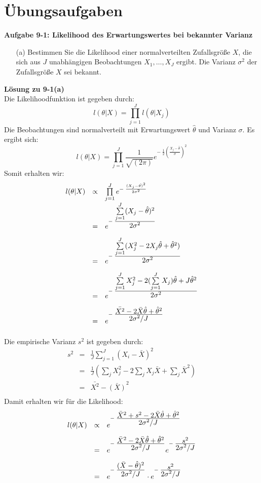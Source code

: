 \newpage
\section{Übungsaufgaben}
\textbf{Aufgabe 9-1: Likelihood des Erwartungswertes bei bekannter Varianz}
\begin{itemize}
	\item [(a)] Bestimmen Sie die Likelihood einer normalverteilten Zufallsgröße $X$, die sich aus $J$ unabhängigen Beobachtungen $X_1,\ldots,X_J$ ergibt.
	Die Varianz $\sigma^2$ der Zufallsgröße $X$ sei bekannt.
\end{itemize}

\textbf{Lösung zu 9-1(a)} \\
Die Likelihoodfunktion ist gegeben durch:
\[
l(\theta|X) = \prod_{j=1}^{J} l(\theta|X_j)
\]
Die Beobachtungen sind normalverteilt mit Erwartungswert
$\hat{\theta}$ und Varianz $\sigma$. Es ergibt sich:
\[
l(\theta|X) = \prod_{j=1}^{J} \frac{1}{\sqrt{(2 \pi)}}
e^{-\;\frac{1}{2}\left(\frac{X_j-\hat{\theta}}{\sigma}\right)^2}
\]
Somit erhalten wir:
\[
\begin{array}{rcl}
l(\theta|X) & \propto &  \prod\limits_{j=1}^{J}
e^{-\;\frac{(X_j-\hat{\theta)}^2}{2\sigma^2}} \\[2ex]
&=& e^{-\;\frac{\textstyle\sum\limits_{j=1}^{J}(X_j-\hat{\theta})^2}
	{\textstyle 2 \sigma^2}} \\[2ex]
&=& e^{-\;\frac{\textstyle\sum\limits_{j=1}^{J}(X_j^2-2X_j\hat{\theta}
	+\hat{\theta}^2)}
	{\textstyle 2 \sigma^2}} \\[2ex]
&=& e^{-\;\frac{\textstyle\sum\limits_{j=1}^{J}X_j^2
		- 2 (\sum\limits_{j=1}^{J}X_j) \hat{\theta}
		+J \hat{\theta}^2}
	{\textstyle 2 \sigma^2}} \\[2ex]
&=& e^{-\;\frac{\textstyle \bar{X^2}-2\bar{X}\hat{\theta}+\hat{\theta}^2}
	{\textstyle 2 \sigma^2/J}} \\[2ex]
\end{array}
\]
Die empirische Varianz $s^2$ ist gegeben durch:
\[
\begin{array}{rcl}
s^2 &=& \frac{1}{J} \sum\limits_{j=1}^{J} (X_i - \bar{X})^2 \\[2ex]
    &=& \frac{1}{J} (\sum_j X_j^2-2 \sum_j X_j \bar{X} + \sum_j \bar{X}^2) \\[2ex]
    &=& \bar{X^2} -\bar{(X)}^2 \\[2ex]
\end{array}
\]
Damit erhalten wir für die Likelihood:
\[
\begin{array}{rcl}
l(\theta|X) & \propto &
e^{-\;\frac{\textstyle \bar{X}^2 +s^2 -2\bar{X} \hat{\theta}+\hat{\theta}^2}
	{\textstyle 2 \sigma^2/J}} \\[2ex]
&=& e^{-\;\frac{\textstyle \bar{X}^2 -2\bar{X} \hat{\theta}+\hat{\theta}^2}
	{\textstyle 2 \sigma^2/J}}
e^{-\;\frac{\textstyle s^2 }
	{\textstyle 2 \sigma^2/J}} \\[2ex]
&=& e^{-\;\frac{\textstyle (\bar{X} - \hat{\theta})^2}
	{\textstyle 2 \sigma^2/J}}
    \cdot e^{-\;\frac{\textstyle s^2 }
	{\textstyle 2 \sigma^2/J}}
\end{array}
\]
